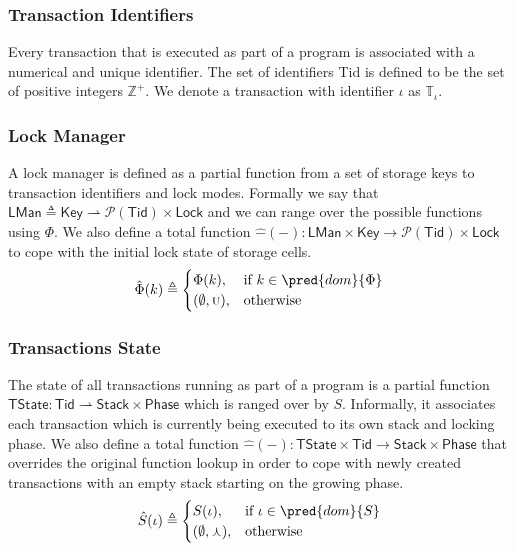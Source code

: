 \subsubsection{Transaction Identifiers}

Every transaction that is executed as part of a program is associated with a numerical and unique identifier. The set of identifiers \textsf{Tid} is defined to be the set of positive integers $\mathds{Z}^+$. We denote a transaction with identifier $\iota$ as $\mathds{T}_\iota$.

\subsubsection{Lock Manager}

A lock manager is defined as a partial function from a set of storage keys to transaction identifiers and lock modes. Formally we say that $\mathsf{LMan} \triangleq \mathsf{Key} \rightharpoonup \mathcal{P}(\mathsf{Tid}) \times \mathsf{Lock}$ and we can range over the possible functions using $\Phi$. We also define a total function $\hat{-}(-) : \mathsf{LMan} \times \mathsf{Key} \rightarrow \mathcal{P}(\mathsf{Tid}) \times \mathsf{Lock}$ to cope with the initial lock state of storage cells.
\[
\hat{\Phi}(k) \triangleq
\begin{cases}
\Phi(k), & \text{if } k \in \pred{dom}{\Phi} \\
(\emptyset, \textsc{u}), & \text{otherwise}
\end{cases}
\]

\subsubsection{Transactions State}

The state of all transactions running as part of a program is a partial function $\mathsf{TState} : \mathsf{Tid} \rightharpoonup \mathsf{Stack} \times \mathsf{Phase}$ which is ranged over by $S$. Informally, it associates each transaction which is currently being executed to its own stack and locking phase. We also define a total function $\hat{-}(-) : \mathsf{TState} \times \mathsf{Tid} \rightarrow \mathsf{Stack} \times \mathsf{Phase}$ that overrides the original function lookup in order to cope with newly created transactions with an empty stack starting on the growing phase.
\[
\hat{S}(\iota) \triangleq \begin{cases}
S(\iota), & \text{if } \iota \in \pred{dom}{S} \\
(\emptyset, \curlywedge), & \text{otherwise}
\end{cases}
\]

